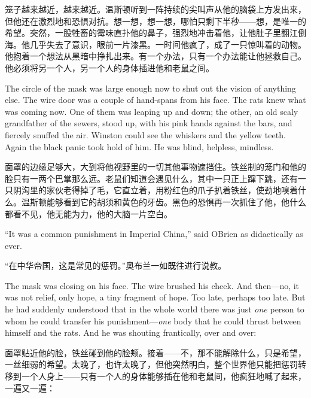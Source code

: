 \begin{paracol}{2}
\switchcolumn

笼子越来越近，越来越近。温斯顿听到一阵持续的尖叫声从他的脑袋上方发出来，但他还在激烈地和恐惧对抗。想一想，想一想，哪怕只剩下半秒——想，是唯一的希望。突然，一股牲畜的霉味直扑他的鼻子，强烈地冲击着他，让他肚子里翻江倒海。他几乎失去了意识，眼前一片漆黑。一时间他疯了，成了一只惊叫着的动物。他抱着一个想法从黑暗中挣扎出来。有一个办法，只有一个办法能让他拯救自己。他必须将另一个人，另一个人的身体插进他和老鼠之间。

\switchcolumn*

The circle of the mask was large enough now to shut out the vision of
anything else. The wire door was a couple of hand-spans from his face.
The rats knew what was coming now. One of them was leaping up and down;
the other, an old scaly grandfather of the sewers, stood up, with his
pink hands against the bars, and fiercely snuffed the air. Winston could
see the whiskers and the yellow teeth. Again the black panic took hold
of him. He was blind, helpless, mindless.

\switchcolumn

面罩的边缘足够大，大到将他视野里的一切其他事物遮挡住。铁丝制的笼门和他的脸只有一两个巴掌那么远。老鼠们知道会遇见什么，其中一只正上蹿下跳，还有一只阴沟里的家伙老得掉了毛，它直立着，用粉红色的爪子扒着铁丝，使劲地嗅着什么。温斯顿能够看到它的胡须和黄色的牙齿。黑色的恐惧再一次抓住了他，他什么都看不见，他无能为力，他的大脑一片空白。

\switchcolumn*

``It was a common punishment in Imperial China,'' said
O\textquotesingle Brien as didactically as ever.

\switchcolumn

``在中华帝国，这是常见的惩罚。''奥布兰一如既往进行说教。

\switchcolumn*

The mask was closing on his face. The wire brushed his cheek. And
then---no, it was not relief, only hope, a tiny fragment of hope. Too
late, perhaps too late. But he had suddenly understood that in the whole
world there was just \emph{one} person to whom he could transfer his
punishment---\emph{one} body that he could thrust between himself and
the rats. And he was shouting frantically, over and over:

\switchcolumn

面罩贴近他的脸，铁丝碰到他的脸颊。接着——不，那不能解除什么，只是希望，一丝细弱的希望。太晚了，也许太晚了，但他突然明白，整个世界他只能把惩罚转移到一个人身上——只有一个人的身体能够插在他和老鼠间，他疯狂地喊了起来，一遍又一遍：


\end{paracol}
